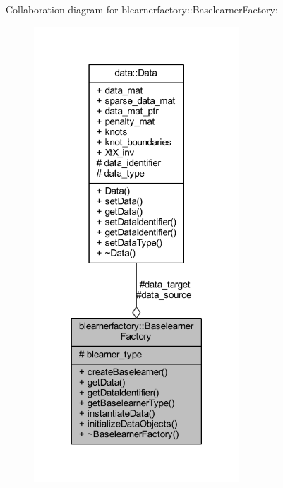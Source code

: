 Collaboration diagram for blearnerfactory\+:\+:Baselearner\+Factory\+:\nopagebreak
\begin{figure}[H]
\begin{center}
\leavevmode
\includegraphics[width=218pt]{classblearnerfactory_1_1_baselearner_factory__coll__graph}
\end{center}
\end{figure}
